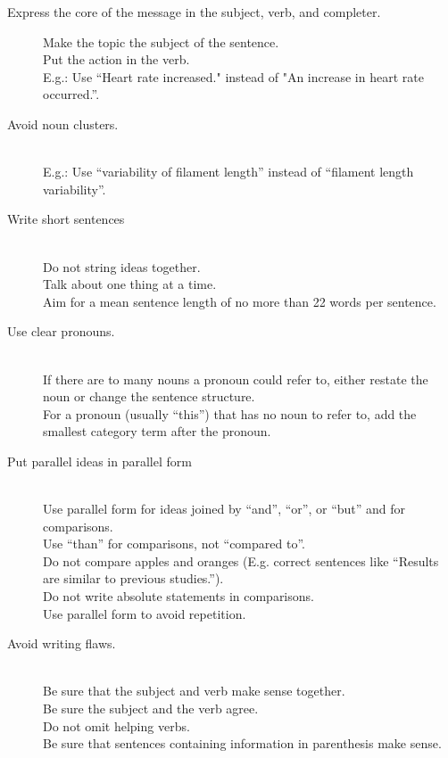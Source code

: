 \begin{description}
	\item[Express the core of the message in the subject, verb, and completer.]
		Make the topic the subject of the sentence.\hfill \\
		Put the action in the verb.\hfill \\
		E.g.: Use ``Heart rate increased." instead of "An increase in heart rate occurred.''.
	\item[Avoid noun clusters.] \hfill \\
		E.g.: Use ``variability of filament length'' instead of ``filament length variability''.
	\item[Write short sentences] \hfill \\
		Do not string ideas together. \hfill \\
		Talk about one thing at a time. \hfill \\
		Aim for a mean sentence length of no more than 22 words per sentence.
	\item[Use clear pronouns.] \hfill \\
		If there are to many nouns a pronoun could refer to, either restate the noun or change the sentence structure.\hfill \\
		For a pronoun (usually ``this'') that has no noun to refer to, add the smallest category term after the pronoun.	
	\item[Put parallel ideas in parallel form] \hfill \\
		Use parallel form for ideas joined by ``and'', ``or'', or ``but'' and for comparisons.	\hfill \\
		Use ``than'' for comparisons, not ``compared to''. \hfill \\ 
		Do not compare apples and oranges (E.g. correct sentences like ``Results are similar to previous studies.''). \hfill \\
		Do not write absolute statements in comparisons. \hfill \\
		Use parallel form to avoid repetition.
	\item[Avoid writing flaws.] \hfill \\
		Be sure that the subject and verb make sense together. \hfill \\
		Be sure the subject and the verb agree. \hfill \\
		Do not omit helping verbs. \hfill \\
		Be sure that sentences containing information in parenthesis make sense.
\end{description}

